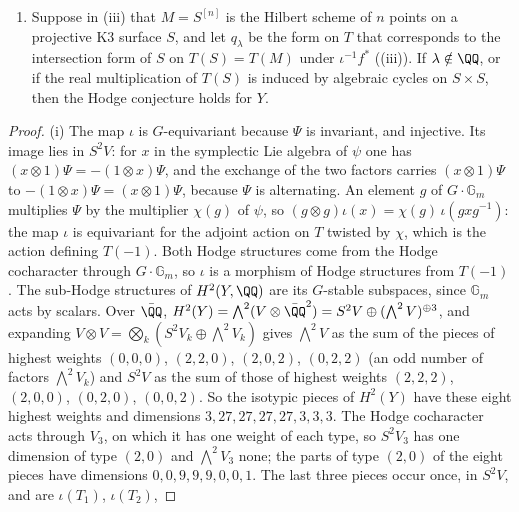 \begin{proposition}
\begin{enumerate}[label=\textup{(\roman*)},leftmargin=2.6em,itemsep=2pt]
  products of classes in $T(M)$; $f$ is generically finite onto a subvariety
  of dimension eight on which $\sigma_{M}$ is generically nondegenerate;
  $b_{2}(M)\ge10$; and $\dim M\ge10$.
\item Suppose in (iii) that $M=S^{[n]}$ is the Hilbert scheme of $n$ points
  on a projective K3 surface $S$, and
  let $q_{\lambda}$ be the form on $T$ that corresponds to the intersection
  form of $S$ on $T(S)=T(M)$ under $\iota^{-1}f^{*}$
  ((iii)). If $\lambda\notin\QQ$, or if the real
  multiplication of $T(S)$ is induced by algebraic cycles on $S\times S$,
  then the Hodge conjecture holds for $Y$.
\end{enumerate}
\end{proposition}

\begin{proof}
(i) The map $\iota$ is $G$-equivariant because $\Psi$ is invariant, and
injective. Its image lies in $S^{2}V$: for $x$ in the symplectic Lie algebra
of $\psi$ one has $(x\otimes1)\Psi=-(1\otimes x)\Psi$, and the exchange of the
two factors carries $(x\otimes1)\Psi$ to $-(1\otimes x)\Psi=(x\otimes1)\Psi$,
because $\Psi$ is alternating. An element $g$ of $G\cdot\mathbb{G}_{m}$
multiplies $\Psi$ by the multiplier $\chi(g)$ of $\psi$, so $(g\otimes g)\iota(x)=
\chi(g)\,\iota(gxg^{-1})$: the map $\iota$ is equivariant for the adjoint
action on $T$ twisted by $\chi$, which is the action defining $T(-1)$. Both
Hodge structures come from the Hodge cocharacter through
$G\cdot\mathbb{G}_{m}$, so $\iota$ is a morphism of Hodge structures from
$T(-1)$. The sub-Hodge structures of $H^{2}(Y,\QQ)$ are its $G$-stable
subspaces, since $\mathbb{G}_{m}$ acts by scalars. Over $\bar{\QQ}$,
$H^{2}(Y)=\bigwedge^{2}(V\otimes\bar{\QQ}^{2})=S^{2}V\oplus(\bigwedge^{2}V)^{\oplus3}$,
and expanding $V\otimes V=\bigotimes_{k}(S^{2}V_{k}\oplus\bigwedge^{2}V_{k})$
gives $\bigwedge^{2}V$ as the sum of the pieces of highest weights $(0,0,0)$,
$(2,2,0)$, $(2,0,2)$, $(0,2,2)$ (an odd number of factors $\bigwedge^{2}V_{k}$)
and $S^{2}V$ as the sum of those of highest weights $(2,2,2)$, $(2,0,0)$,
$(0,2,0)$, $(0,0,2)$. So the isotypic pieces of $H^{2}(Y)$ have these eight
highest weights and dimensions $3,27,27,27,27,3,3,3$. The Hodge cocharacter
acts through $V_{3}$, on which it has one weight of each type, so $S^{2}V_{3}$
has one dimension of type $(2,0)$ and $\bigwedge^{2}V_{3}$ none; the parts of
type $(2,0)$ of the eight pieces have dimensions $0,0,9,9,9,0,0,1$. The last
three pieces occur once, in $S^{2}V$, and are $\iota(T_{1})$, $\iota(T_{2})$,

\end{proof}
